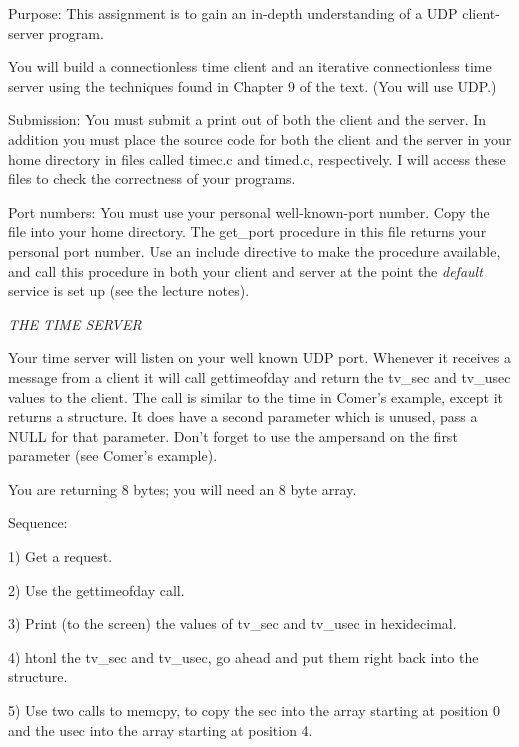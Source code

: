

\parindent 0pt

Purpose: This assignment is to gain an in-depth understanding of
a UDP client-server program.

You will build a connectionless time client and an iterative connectionless
time server using the techniques found in Chapter 9 of the text.
(You will use UDP.)

Submission: You must submit a print out of both the client and the server.
In addition you must place the source code for both the client and
the server in your home directory in files called {\ltt{}timec.c}
and {\ltt{}timed.c}, respectively. I will access these files to check
the correctness of your programs.

Port numbers: You must use your personal well-known-port number.
Copy the file\hfill{}
into your home directory. The {\ltt{}get_port} procedure in this file 
returns your personal port number.
Use an include directive to make the procedure available,
and call this procedure in both your client and server at the point
the {\it default} service is set up (see the lecture notes).

\noindent
{\it THE TIME SERVER}

Your time server will listen on your well known UDP port.
Whenever it receives a message from a client it will call {\ltt{}gettimeofday}
and return the {\ltt{}tv_sec} and {\ltt{}tv_usec} values to the client.
The call is similar to the {\ltt{}time} in Comer's example,
except it returns a structure.
It does have a second parameter which is unused, pass a {\ltt{}NULL}
for that parameter.
Don't forget to use the ampersand on the first parameter
(see Comer's example).

You are returning 8 bytes; you will need an 8 byte array.

Sequence:

1) Get a request.

2) Use the {\ltt{}gettimeofday} call.

3) Print (to the screen) the values of
{\ltt{}tv_sec} and {\ltt{}tv_usec} in hexidecimal.

4) htonl the {\ltt{}tv_sec} and {\ltt{}tv_usec},
go ahead and put them right back into the structure.

5) Use two calls to {\ltt{}memcpy}, to copy the sec into
the array starting at position 0 and
the usec into the array starting at position 4.

